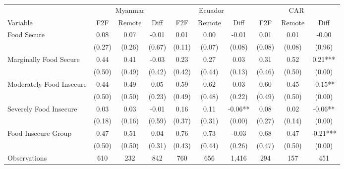 \begin{tabular}{l*{9}c}
\hline\hline
 & \multicolumn{3}{c}{Myanmar} & \multicolumn{3}{c}{Ecuador} & \multicolumn{3}{c}{CAR}\\ 
Variable & F2F & Remote & Diff & F2F & Remote & Diff & F2F & Remote & Diff \\
\hline
Food Secure&0.08&0.07&-0.01&0.01&0.00&-0.01&0.01&0.01&-0.00\\
&(0.27)&(0.26)&(0.67)&(0.11)&(0.07)&(0.08)&(0.08)&(0.08)&(0.96)\\
Marginally Food Secure&0.44&0.41&-0.03&0.23&0.27&0.03&0.31&0.52&0.21***\\
&(0.50)&(0.49)&(0.42)&(0.42)&(0.44)&(0.13)&(0.46)&(0.50)&(0.00)\\
Moderately Food Insecure&0.44&0.49&0.05&0.59&0.62&0.03&0.60&0.45&-0.15**\\
&(0.50)&(0.50)&(0.23)&(0.49)&(0.48)&(0.22)&(0.49)&(0.50)&(0.00)\\
Severely Food Insecure&0.03&0.03&-0.01&0.16&0.11&-0.06**&0.08&0.02&-0.06**\\
&(0.18)&(0.16)&(0.59)&(0.37)&(0.31)&(0.00)&(0.27)&(0.14)&(0.00)\\
Food Insecure Group&0.47&0.51&0.04&0.76&0.73&-0.03&0.68&0.47&-0.21***\\
&(0.50)&(0.50)&(0.31)&(0.43)&(0.44)&(0.26)&(0.47)&(0.50)&(0.00)\\
\hline
Observations & 610 & 232 & 842 & 760 & 656 & 1,416 & 294 & 157 & 451 \\
\hline\hline
\end{tabular}
